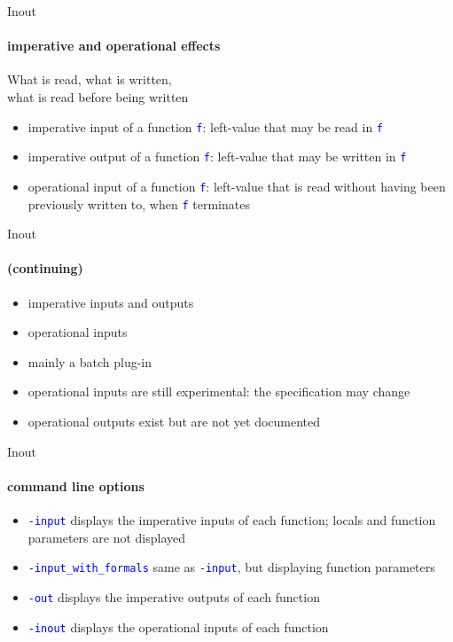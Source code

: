 \documentclass{beamer}
\newcommand{\orange}[1]{{\textcolor{frama-c-1}{#1}}}
\newcommand{\orangepale}[1]{{\textcolor{frama-c-2}{#1}}}
\newcommand{\vvert}[1]{{\textcolor{vert}{#1}}}
\newcommand{\bleu}[1]{{\textcolor{blue}{#1}}}
\newcommand{\code}[1]{\bleu{\texttt{#1}}}
\newcommand{\continuing}{\framesubtitle{(continuing)}}
\newcommand{\intro}[1]{\begin{center}\vvert{#1}\end{center}}
\newenvironment{sect}[1]{\orange{#1}\begin{itemize}}{\end{itemize}}
\newenvironment{features}{\begin{sect}{Features}}{\end{sect}}
\newenvironment{warnings}{\begin{sect}{Warnings}}{\end{sect}}
\newenvironment{howtouse}{\begin{sect}{How to use}}{\end{sect}}
\begin{document}

\begin{frame}{Inout}
\framesubtitle{imperative and operational effects}

\intro{What is read, what is written, \\
  what is read before being written}

\begin{sect}{Definitions}
\item \orangepale{imperative input} of a function \code{f}: left-value that may
  be read in \code{f}
\item \orangepale{imperative output} of a function \code{f}: left-value that
  may be written in \code{f}
\item \orangepale{operational input} of a function \code{f}: left-value that
  is read without having been previously written to, when \code{f}
  terminates
\end{sect}

\end{frame}


\begin{frame}{Inout}
\continuing

\begin{features}
\item imperative inputs and outputs
\item operational inputs
\end{features}

\begin{warnings}
\item mainly a batch plug-in
\item operational inputs are still experimental: the specification may
  change
\item operational outputs exist but are not yet documented
\end{warnings}\medskip

\end{frame}


\begin{frame}{Inout}
\framesubtitle{command line options}

\begin{howtouse}
\item \code{-input} displays the imperative inputs of each
  function; locals and function parameters are not displayed
\item \code{-input\_with\_formals} same as \code{-input}, but displaying
  function parameters
\item \code{-out} displays the imperative outputs of each function
\item \code{-inout} displays the operational inputs of each function
\end{howtouse}

\end{frame}
\end{document}
